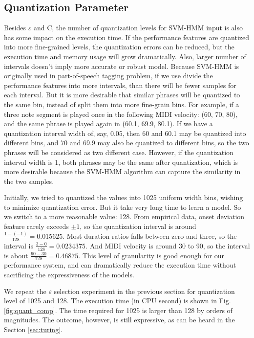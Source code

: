 \subsection{Quantization Parameter}
Besides $\varepsilon$ and C, the number of quantization levels for SVM-HMM input is also has some impact on the execution time. If the performance features are quantized into more fine-grained levels, the quantization errors can be reduced, but the execution time and memory usage will grow dramatically. Also, larger number of intervals doesn't imply more accurate or robust model. Because SVM-HMM is originally used in part-of-speech tagging problem, if we use divide the performance features into more intervals, than there will be fewer samples for each interval. But it is more desirable that similar phrases will be quantized to the same bin, instead of split them into more fine-grain bins. For example, if a three note segment is played once in the following MIDI velocity: (60, 70, 80), and the same phrase is played again in (60.1, 69.9, 80.1). If we have a quantization interval width of, say, 0.05, then 60 and 60.1 may be quantized into different bins, and 70 and 69.9 may also be quantized to different bins, so the two phrases will be considered as two different case. However, if the quantization interval width is 1, both phrases may be the same after quantization, which is more desirable because the SVM-HMM algorithm can capture the similarity in the two samples. 

Initially, we tried to quantized the values into 1025 uniform width bins, wishing to minimize quantization error. But it take very long time to learn a model. So we switch to a more reasonable value: 128. From empirical data, onset deviation feature rarely exceeds $\pm 1$, so the quantization interval is around $\frac{1-(-1)}{128} = 0.015625$. Most duration ratios falls between zero and three, so the interval is $\frac{3-0}{128} = 0.0234375$. And MIDI velocity is around 30 to 90, so the interval is about $\frac{90-30}{128} = 0.46875$. This level of granularity is good enough for our performance system, and can dramatically reduce the execution time without sacrificing the expressiveness of the models. 

We repeat the $\varepsilon$ selection experiment in the previous section for quantization level of 1025 and 128. The execution time (in CPU second) is shown in Fig. \ref{fig:quant_comp}. The time required for 1025 is larger than 128 by orders of magnitudes. The outcome, however, is still expressive, as can be heard in the Section \ref{sec:turing}.

